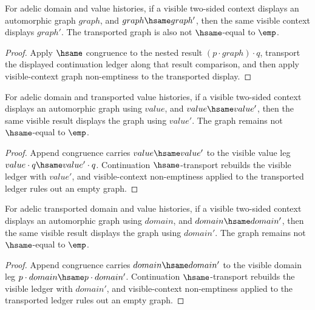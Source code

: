 \begin{theorem}
\label{thm:automorphic-adele-graph-visible-context-result-hsame-transport}
For adelic domain and value histories, if a visible two-sided context displays
an automorphic graph \(graph\), and \(graph\hsame graph'\), then the same
visible context displays \(graph'\). The transported graph is also not
\(\hsame\)-equal to \(\emp\).
\end{theorem}
\begin{proof}
Apply \(\hsame\) congruence to the nested result
\((p\cdot graph)\cdot q\), transport the displayed continuation ledger along
that result comparison, and then apply visible-context graph non-emptiness to
the transported display.
\end{proof}

\begin{theorem}
\label{thm:automorphic-adele-graph-visible-context-value-hsame-transport}
For adelic domain and transported value histories, if a visible two-sided
context displays an automorphic graph using \(value\), and
\(value\hsame value'\), then the same visible result displays the graph using
\(value'\). The graph remains not \(\hsame\)-equal to \(\emp\).
\end{theorem}
\begin{proof}
Append congruence carries \(value\hsame value'\) to the visible value leg
\(value\cdot q\hsame value'\cdot q\). Continuation \(\hsame\)-transport
rebuilds the visible ledger with \(value'\), and visible-context non-emptiness
applied to the transported ledger rules out an empty graph.
\end{proof}

\begin{theorem}
\label{thm:automorphic-adele-graph-visible-context-domain-hsame-transport}
For adelic transported domain and value histories, if a visible two-sided
context displays an automorphic graph using \(domain\), and
\(domain\hsame domain'\), then the same visible result displays the graph using
\(domain'\). The graph remains not \(\hsame\)-equal to \(\emp\).
\end{theorem}
\begin{proof}
Append congruence carries \(domain\hsame domain'\) to the visible domain leg
\(p\cdot domain\hsame p\cdot domain'\). Continuation \(\hsame\)-transport
rebuilds the visible ledger with \(domain'\), and visible-context non-emptiness
applied to the transported ledger rules out an empty graph.
\end{proof}

